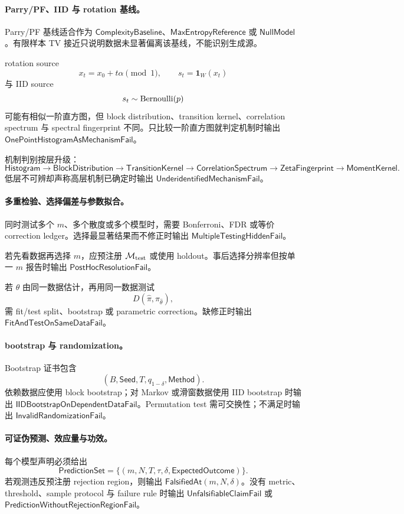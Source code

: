 \paragraph{Parry/PF、IID 与 rotation 基线。}
Parry/PF 基线适合作为 \(\mathsf{ComplexityBaseline}\)、\(\mathsf{MaxEntropyReference}\) 或 \(\mathsf{NullModel}\)。有限样本 TV 接近只说明数据未显著偏离该基线，不能识别生成源。

rotation source
\[
x_t=x_0+t\alpha\pmod1,\qquad s_t=\mathbf1_W(x_t)
\]
与 IID source
\[
s_t\sim{\rm Bernoulli}(p)
\]
可能有相似一阶直方图，但 block distribution、transition kernel、correlation spectrum 与 spectral fingerprint 不同。只比较一阶直方图就判定机制时输出 \(\mathsf{OnePointHistogramAsMechanismFail}\)。

机制判别按层升级：
\[
\boxed{
\mathsf{Histogram}
\to
\mathsf{BlockDistribution}
\to
\mathsf{TransitionKernel}
\to
\mathsf{CorrelationSpectrum}
\to
\mathsf{ZetaFingerprint}
\to
\mathsf{MomentKernel}.
}
\]
低层不可辨却声称高层机制已确定时输出 \(\mathsf{UnderidentifiedMechanismFail}\)。

\paragraph{多重检验、选择偏差与参数拟合。}
同时测试多个 \(m\)、多个散度或多个模型时，需要 Bonferroni、FDR 或等价 correction ledger。选择最显著结果而不修正时输出 \(\mathsf{MultipleTestingHiddenFail}\)。

若先看数据再选择 \(m\)，应预注册 \(\mathcal M_{\rm test}\) 或使用 holdout。事后选择分辨率但按单一 \(m\) 报告时输出 \(\mathsf{PostHocResolutionFail}\)。

若 \(\theta\) 由同一数据估计，再用同一数据测试
\[
D(\widehat\pi,\pi_{\widehat\theta}),
\]
需 fit/test split、bootstrap 或 parametric correction。缺修正时输出 \(\mathsf{FitAndTestOnSameDataFail}\)。

\paragraph{bootstrap 与 randomization。}
Bootstrap 证书包含
\[
(B,\mathsf{Seed},T,q_{1-\delta},\mathsf{Method}).
\]
依赖数据应使用 block bootstrap；对 Markov 或滑窗数据使用 IID bootstrap 时输出 \(\mathsf{IIDBootstrapOnDependentDataFail}\)。Permutation test 需可交换性；不满足时输出 \(\mathsf{InvalidRandomizationFail}\)。

\paragraph{可证伪预测、效应量与功效。}
每个模型声明必须给出
\[
\boxed{
\mathsf{PredictionSet}
=
\{(m,N,T,\tau,\delta,\mathsf{ExpectedOutcome})\}.
}
\]
若观测违反预注册 rejection region，则输出 \(\mathsf{FalsifiedAt}(m,N,\delta)\)。没有 metric、threshold、sample protocol 与 failure rule 时输出 \(\mathsf{UnfalsifiableClaimFail}\) 或 \(\mathsf{PredictionWithoutRejectionRegionFail}\)。

